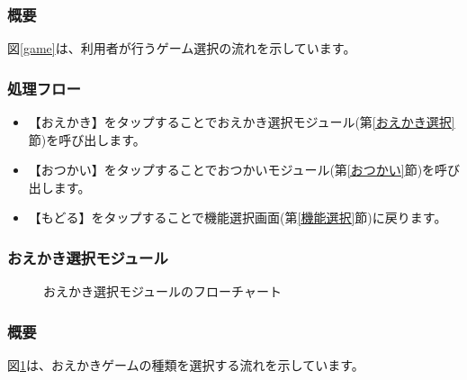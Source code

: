 \documentclass[a4j]{jarticle}
\begin{document}
\subsubsection*{概要}
 図\ref{game}は、利用者が行うゲーム選択の流れを示しています。

\subsubsection*{処理フロー}
\begin{itemize}
\item 【おえかき】をタップすることでおえかき選択モジュール(第\ref{おえかき選択}節)を呼び出します。
\item 【おつかい】をタップすることでおつかいモジュール(第\ref{おつかい}節)を呼び出します。
\item 【もどる】をタップすることで機能選択画面(第\ref{機能選択}節)に戻ります。
\end{itemize}

\newpage

\subsubsection{おえかき選択モジュール\label{おえかき選択}}
\begin{figure}[H]
    \begin{center}
    \caption {おえかき選択モジュールのフローチャート}
    \label{oekaki}
    \end{center}
\end{figure}

\subsubsection*{概要}
 図\ref{oekaki}は、おえかきゲームの種類を選択する流れを示しています。
\end{document}
